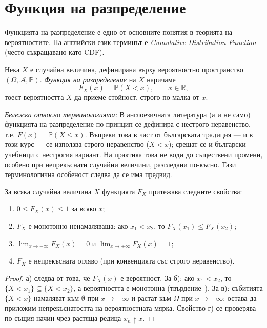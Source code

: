 \section{Функция на разпределение}

Функцията на разпределение е едно от основните понятия в теорията на вероятностите. На английски език терминът е \emph{Cumulative Distribution Function} (често съкращавано като CDF).

\begin{keydefn}\label{def:cdf}
Нека $X$ е случайна величина, дефинирана върху вероятностно пространство
$(\Omega, \mathcal{A}, \mathbb{P})$. \emph{Функция на разпределение} на $X$ наричаме
\[ F_X(x) = \mathbb{P}(X < x), \qquad x \in \mathbb{R} , \]
тоест вероятността $X$ да приеме стойност, строго по-малка от $x$.
\end{keydefn}

\emph{Бележка относно терминологията:} В англоезичната литература (а и не само) функцията на разпределение по принцип се дефинира с нестрого неравенство, т.е. $F(x) = \mathbb{P}(X \le x)$. Въпреки това в част от българската традиция — и в този курс — се използва строго неравенство ($X < x$); срещат се и български учебници с нестрогия вариант. На практика това не води до съществени промени, особено при непрекъснати случайни величини, разгледани по-късно. Тази терминологична особеност следва да се има предвид.

\begin{prop}\label{prop:cdf-props}
За всяка случайна величина $X$ функцията $F_X$ притежава следните свойства:
\begin{enumerate}
    \item[а)] $0 \le F_X(x) \le 1$ за всяко $x$;
    \item[б)] $F_X$ е монотонно ненамаляваща: ако $x_1 < x_2$, то $F_X(x_1) \le F_X(x_2)$;
    \item[в)] $\displaystyle \lim_{x \to -\infty} F_X(x) = 0$ и $\displaystyle \lim_{x \to +\infty} F_X(x) = 1$;
    \item[г)] $F_X$ е непрекъсната отляво (при конвенцията със строго неравенство).
\end{enumerate}
\end{prop}

\begin{proof}
а) следва от това, че $F_X(x)$ е вероятност. За б): ако $x_1 < x_2$, то
$\{X < x_1\} \subseteq \{X < x_2\}$, а вероятността е монотонна
(твърдение~). За в): събитията
$\{X < x\}$ намаляват към $\emptyset$ при $x \to -\infty$ и растат към $\Omega$ при
$x \to +\infty$; остава да приложим непрекъснатостта на вероятностната мярка. Свойство г)
се проверява по същия начин чрез растяща редица $x_n \uparrow x$.
\end{proof}

